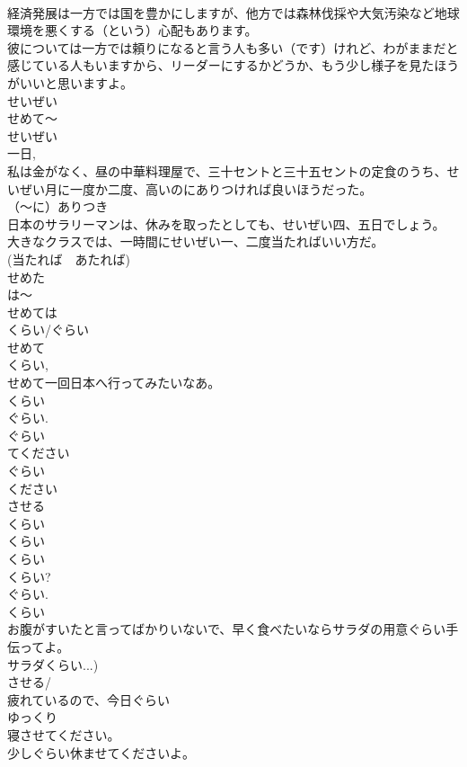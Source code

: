 \documentclass[8pt]{extreport}
\begin{document}
\begin{CJK}{UTF8}{min}
\\	経済発展は一方では国を豊かにしますが、他方では森林伐採や大気汚染など地球環境を悪くする（という）心配もあります。
\\	彼については一方では頼りになると言う人も多い（です）けれど、わがままだと感じている人もいますから、リーダーにするかどうか、もう少し様子を見たほうがいいと思いますよ。	
\\	せいぜい	
\\	せめて～
\\	せいぜい
\\	一日, 
\\	私は金がなく、昼の中華料理屋で、三十セントと三十五セントの定食のうち、せいぜい月に一度か二度、高いのにありつければ良いほうだった。
\\	（～に）ありつき　　
\\	日本のサラリーマンは、休みを取ったとしても、せいぜい四、五日でしょう。
\\	大きなクラスでは、一時間にせいぜい一、二度当たればいい方だ。
\\	(当たれば　あたれば) 
\\	せめた
\\	は～
\\	せめては
\\	くらい/ぐらい 
\\	せめて 
\\	くらい, 
\\	せめて一回日本へ行ってみたいなあ。
\\	くらい
\\	ぐらい.
\\	ぐらい
\\	てください
\\	ぐらい
\\	ください
\\	させる 
\\	くらい
\\	くらい
\\	くらい
\\	くらい? 
\\	ぐらい.
\\	くらい
\\	お腹がすいたと言ってばかりいないで、早く食べたいならサラダの用意ぐらい手伝ってよ。
\\	サラダくらい...)
\\	させる/
\\	疲れているので、今日ぐらい
\\	ゆっくり
\\	寝させてください。
\\	少しぐらい休ませてくださいよ。

\end{CJK}
\end{document}
